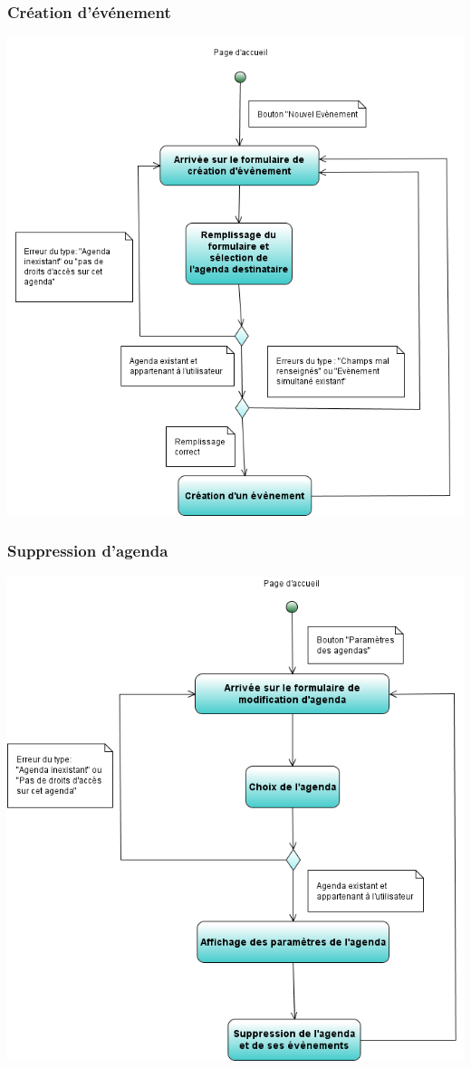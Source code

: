\documentclass[12pt , a4paper]{article}
\begin{document}
\subsubsection{Création d'événement}
\begin{center}
  \includegraphics[scale=0.6]{./images/diag_act_creation_evenement.png}
\end{center}

\subsubsection{Suppression d'agenda}
\begin{center}
  \includegraphics[scale=0.6]{./images/diag_act_suppression_agenda.png}
\end{center}
\end{document}
